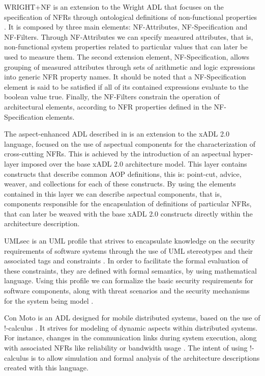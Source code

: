 \documentclass[10pt]{article}
\begin{document}
WRIGHT+NF is an extension to the Wright ADL that focuses on the specification of NFRs through ontological definitions of non-functional properties \cite{Suleiman08}. It is composed by three main elements: NF-Attributes, NF-Specification and NF-Filters. Through NF-Attributes we can specify measured attributes, that is, non-functional system properties related to particular values that can later be used to measure them. The second extension element, NF-Specification, allows grouping of measured attributes through sets of arithmetic and logic expressions into generic NFR property names. It should be noted that a NF-Specification element is said to be satisfied if all of its contained expressions evaluate to the boolean value true. Finally, the NF-Filters constrain the operation of architectural elements, according to NFR properties defined in the NF-Specification elements.

The aspect-enhanced ADL described in \cite{Baheri07} is an extension to the xADL 2.0 language, focused on the use of aspectual components for the characterization of cross-cutting NFRs. This is achieved by the introduction of an aspectual hyper-layer imposed over the base xADL 2.0 architecture model. This layer contains constructs that describe common AOP definitions, this is: point-cut, advice, weaver, and collections for each of these constructs. By using the elements contained in this layer we can describe aspectual components, that is, components responsible for the encapsulation of definitions of particular NFRs, that can later be weaved with the base xADL 2.0 constructs directly within the architecture description.

UMLsec is an UML profile that strives to encapsulate knowledge on the security requirements of software systems through the use of UML stereotypes and their associated tags and constraints \cite{Jurgens02}. In order to facilitate the formal evaluation of these constraints, they are defined with formal semantics, by using mathematical language. Using this profile we can formalize the basic security requirements for software components, along with threat scenarios and the security mechanisms for the system being model \cite{Jurgens02}.

Con Moto is an ADL designed for mobile distributed systems, based on the use of !-calculus \cite{Gruhn04}. It strives for modeling of dynamic aspects within distributed systems. For instance, changes in the communication links during system execution, along with associated NFRs like reliability or bandwidth usage \cite{Gruhn04}. The intent of using !-calculus is to allow simulation and formal analysis of the architecture descriptions created with this language.
\end{document}
